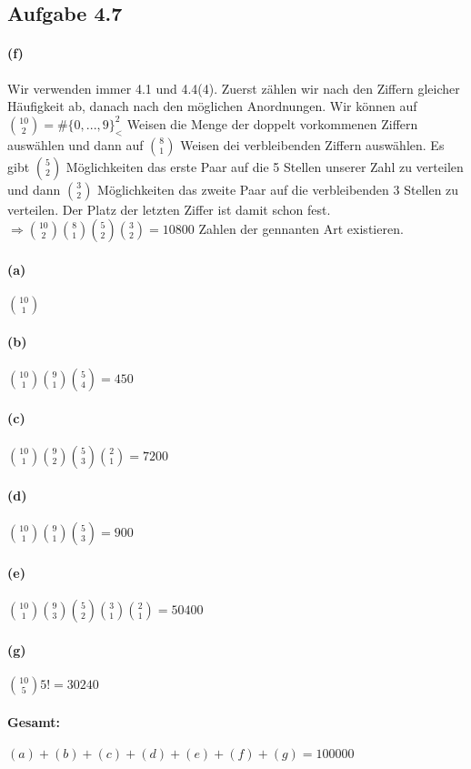 \documentclass[10pt, a4paper]{article}
\begin{document}
\subsection{Aufgabe 4.7}
\paragraph*{(f)}
Wir verwenden immer 4.1 und 4.4(4). Zuerst zählen wir nach den Ziffern gleicher Häufigkeit ab, danach nach den möglichen Anordnungen. Wir können auf $\binom{10}{2}=\#\{0,...,9\}_{<}^{2}$ Weisen die Menge der doppelt vorkommenen Ziffern auswählen und dann auf $\binom{8}{1}$ Weisen dei verbleibenden Ziffern auswählen. Es gibt $\binom{5}{2}$ Möglichkeiten das erste Paar auf die 5 Stellen unserer Zahl zu verteilen und dann $\binom{3}{2}$ Möglichkeiten das zweite Paar auf die verbleibenden 3 Stellen zu verteilen. Der Platz der letzten Ziffer ist damit schon fest.\\
$\Rightarrow \binom{10}{2}\binom{8}{1}\binom{5}{2}\binom{3}{2}=10800$ Zahlen der gennanten Art existieren.
\paragraph*{(a)}$\binom{10}{1}$
\paragraph*{(b)}$\binom{10}{1}\binom{9}{1}\binom{5}{4}=450$
\paragraph*{(c)}$\binom{10}{1}\binom{9}{2}\binom{5}{3}\binom{2}{1}=7200$
\paragraph*{(d)}$\binom{10}{1}\binom{9}{1}\binom{5}{3}=900$
\paragraph*{(e)}$\binom{10}{1}\binom{9}{3}\binom{5}{2}\binom{3}{1}\binom{2}{1}=50400$
\paragraph*{(g)}$\binom{10}{5}5!=30240$
\paragraph*{Gesamt:}$(a)+(b)+(c)+(d)+(e)+(f)+(g)=100000$
\end{document}
